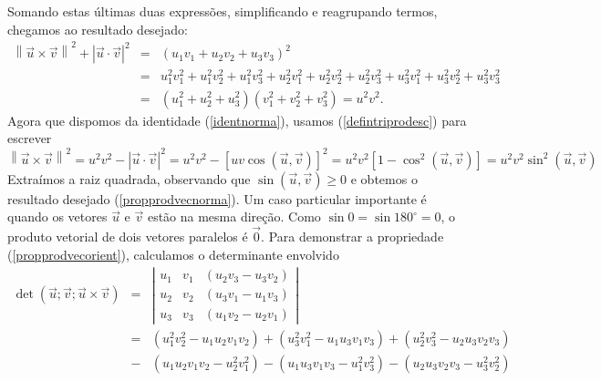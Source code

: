 Somando estas últimas duas expressões, simplificando e reagrupando termos, chegamos ao resultado desejado:
\begin{eqnarray*}
\left\|\vec{u}\times \vec{v}\right\|^2+\left|\vec{u}\cdot \vec{v}\right|^2&=&\left(u_1v_1+u_2v_2+u_3v_3\right)^2\\
&=&u_1^2v_1^2+u_1^2v_2^2+u_1^2v_3^2+u_2^2v_1^2+u_2^2v_2^2+u_2^2v_3^2+u_3^2v_1^2+u_3^2v_2^2+u_3^2v_3^2\\
&=&\left(u_1^2+u_2^2+u_3^2\right)\left(v_1^2+v_2^2+v_3^2\right)=u^2v^2.
\end{eqnarray*}
Agora que dispomos da identidade (\ref{identnorma}), usamos (\ref{defintriprodesc}) para escrever 
\begin{equation*}\left\|\vec{u}\times \vec{v}\right\|^2=u^2v^2-\left|\vec{u}\cdot \vec{v}\right|^2=u^2v^2-\left[uv\cos\left(\vec{u},\vec{v}\right)\right]^2=u^2v^2\left[1-\cos^2\left(\vec{u},\vec{v}\right)\right]=u^2v^2\sin^2\left(\vec{u},\vec{v}\right)
\end{equation*}
Extraímos a raiz quadrada, observando que $\sin\left(\vec{u},\vec{v}\right)\geq 0$ e obtemos o resultado desejado (\ref{propprodvecnorma}).
Um caso particular importante é quando os vetores $\vec{u}$ e $\vec{v}$ estão na mesma direção. Como $\sin 0= \sin 180^\circ=0$, o produto vetorial de dois vetores paralelos é $\vec{0}$.  
Para demonstrar a propriedade (\ref{propprodvecorient}), calculamos o determinante envolvido
\begin{eqnarray*}
\det\left(\vec{u};\vec{v};\vec{u}\times\vec{v}\right)&=&\left|
\begin{array}{ccc}
u_1 & v_1 & \left(u_2v_3-u_3v_2\right)\\  
u_2 & v_2 & \left(u_3v_1-u_1v_3\right)\\ 
u_3 & v_3 &  \left(u_1v_2-u_2v_1\right)
\end{array}
\right|\\
&=&\left(u_1^2v_2^2-u_1u_2v_1v_2\right)+\left(u_3^2v_1^2-u_1u_3v_1v_3\right)+\left(u_2^2v_3^2-u_2u_3v_2v_3\right)\\
&-&\left(u_1u_2v_1v_2-u_2^2v_1^2\right)-\left(u_1u_3v_1v_3-u_1^2v_3^2\right)-\left(u_2u_3v_2v_3-u_3^2v_2^2\right)
\end{eqnarray*}
